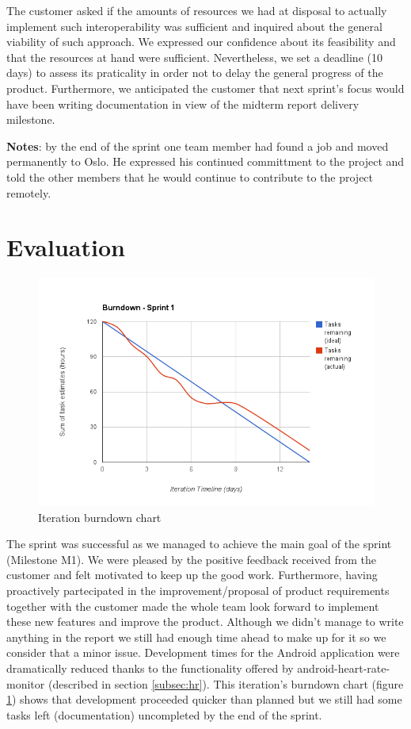 The customer asked if the amounts of resources we had at disposal to actually implement such interoperability
was sufficient and inquired about the general viability of such approach.
We expressed our confidence about its feasibility and that the resources at hand were sufficient.
Nevertheless, we set a deadline (10 days) to assess its praticality in order not to delay the general progress of the product.
Furthermore, we anticipated the customer that next sprint's focus would have been writing documentation in view
of the midterm report delivery milestone.

\textbf{Notes}: by the end of the sprint one team member had found a job and moved permanently to Oslo.
He expressed his continued committment to the project and told the other members that he would continue
to contribute to the project remotely.

\section{Evaluation}

\begin{figure}
\centering
\includegraphics[scale=0.60]{../Figures/burndownSprint1.png}
\caption{Iteration burndown chart}
\label{figure:burndownsprint1}
\end{figure}

The sprint was successful as we managed to achieve the main goal of the sprint (Milestone M1).
We were pleased by the positive feedback received from the customer and felt motivated to keep up the good work. 
Furthermore, having proactively partecipated in the improvement/proposal of product requirements together with the customer made the whole team look forward to implement these new features and improve the product. 
Although we didn't manage to write anything in the report we still had enough time ahead to make up for it so we consider that a minor issue.
Development times for the Android application were dramatically reduced thanks to the functionality offered by android-heart-rate-monitor (described in section \ref{subsec:hr}).
This iteration's burndown chart (figure \ref{figure:burndownsprint1}) shows that development proceeded quicker than planned but we still had some tasks left (documentation) uncompleted by the end of the sprint.

